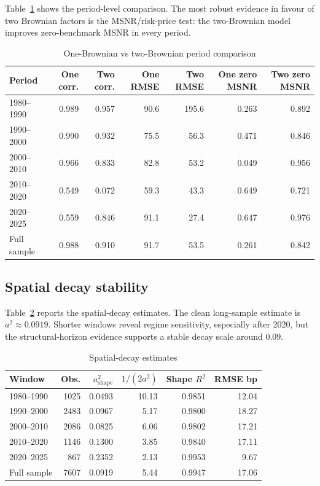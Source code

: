 \documentclass[11pt]{article}
\numberwithin{equation}{section}
\begin{document}
Table~\ref{tab:brownianperiods} shows the period-level comparison. The most robust evidence in favour of two Brownian factors is the MSNR/risk-price test: the two-Brownian model improves zero-benchmark MSNR in every period.

\begin{table}[htbp]\centering\caption{One-Brownian vs two-Brownian period comparison}\label{tab:brownianperiods}\begin{tabular}{lrrrrrr}\toprule
Period&One corr.&Two corr.&One RMSE&Two RMSE&One zero MSNR&Two zero MSNR\\\midrule
1980--1990&0.989&0.957&90.6&195.6&0.263&0.892\\
1990--2000&0.990&0.932&75.5&56.3&0.471&0.846\\
2000--2010&0.966&0.833&82.8&53.2&0.049&0.956\\
2010--2020&0.549&0.072&59.3&43.3&0.649&0.721\\
2020--2025&0.559&0.846&91.1&27.4&0.647&0.976\\
Full sample&0.988&0.910&91.7&53.5&0.261&0.842\\\bottomrule\end{tabular}\end{table}

\subsection{Spatial decay stability}
Table~\ref{tab:a2periods} reports the spatial-decay estimates. The clean long-sample estimate is $a^2\approx0.0919$. Shorter windows reveal regime sensitivity, especially after 2020, but the structural-horizon evidence supports a stable decay scale around 0.09.

\begin{table}[htbp]\centering\caption{Spatial-decay estimates}\label{tab:a2periods}\begin{tabular}{lrrrrr}\toprule
Window&Obs.&$a^2_{\mathrm{shape}}$&$1/(2a^2)$&Shape $R^2$&RMSE bp\\\midrule
1980--1990&1025&0.0493&10.13&0.9851&12.04\\
1990--2000&2483&0.0967&5.17&0.9800&18.27\\
2000--2010&2086&0.0825&6.06&0.9802&17.21\\
2010--2020&1146&0.1300&3.85&0.9840&17.11\\
2020--2025&867&0.2352&2.13&0.9953&9.67\\
Full sample&7607&0.0919&5.44&0.9947&17.06\\\bottomrule\end{tabular}\end{table}
\end{document}

